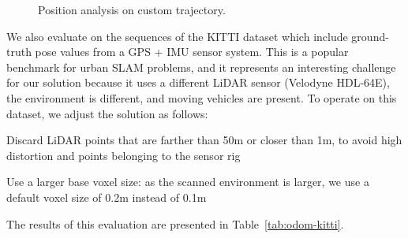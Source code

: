 \begin{figure}[h]
    \centering
    \hspace{1pt}
    \caption[Position analysis on custom trajectory]{Position analysis on custom trajectory. }
    \label{fig:xyz-traj}
\end{figure}
We also evaluate on the sequences of the KITTI dataset \cite{geiger2013vision} which include ground-truth pose values from a GPS + IMU sensor system. This is a popular benchmark for urban SLAM problems, and it represents an interesting challenge for our solution because it uses a different LiDAR sensor (Velodyne HDL-64E), the environment is different, and moving vehicles are present. To operate on this dataset, we adjust the solution as follows:
\begin{compactitem}
    \item Discard LiDAR points that are farther than 50m or closer than 1m, to avoid high distortion and points belonging to the sensor rig
    \item Use a larger base voxel size: as the scanned environment is larger, we use a default voxel size of 0.2m instead of 0.1m
\end{compactitem}
The results of this evaluation are presented in Table~\ref{tab:odom-kitti}.

